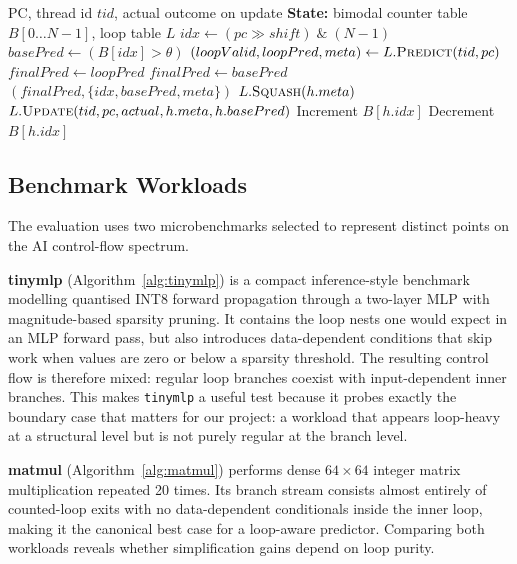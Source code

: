 \documentclass[conference]{IEEEtran}
\begin{document}
\begin{algorithm}[t]
\caption{LABP lookup and update flow}
\label{alg:lapbp}
\footnotesize
\begin{algorithmic}[1]
\Require PC, thread id $tid$, actual outcome on update
\State \textbf{State:} bimodal counter table $B[0 \ldots N-1]$, loop table $L$
    \State $idx \gets (pc \gg shift) \;\&\; (N-1)$
    \State $basePred \gets (B[idx] > \theta)$
    \State $(loopValid, loopPred, meta) \gets L.\textsc{Predict}(tid, pc)$
        \State $finalPred \gets loopPred$
    \Else
        \State $finalPred \gets basePred$
    \EndIf
    \State \Return $(finalPred,\{idx, basePred, meta\})$
\EndFunction
{}
        \State \Return
    \EndIf
        \State $L.\textsc{Squash}(h.meta)$
        \State \Return
    \EndIf
    \State $L.\textsc{Update}(tid, pc, actual, h.meta, h.basePred)$
        \State Increment $B[h.idx]$
    \Else
        \State Decrement $B[h.idx]$
    \EndIf
\EndFunction
\end{algorithmic}
\end{algorithm}

\subsection{Benchmark Workloads}
The evaluation uses two microbenchmarks selected to represent distinct points on the AI control-flow spectrum.

\textbf{tinymlp} (Algorithm~\ref{alg:tinymlp}) is a compact inference-style benchmark modelling quantised INT8 forward propagation through a two-layer MLP with magnitude-based sparsity pruning. It contains the loop nests one would expect in an MLP forward pass, but also introduces data-dependent conditions that skip work when values are zero or below a sparsity threshold. The resulting control flow is therefore mixed: regular loop branches coexist with input-dependent inner branches. This makes \texttt{tinymlp} a useful test because it probes exactly the boundary case that matters for our project: a workload that appears loop-heavy at a structural level but is not purely regular at the branch level.

\textbf{matmul} (Algorithm~\ref{alg:matmul}) performs dense $64\times64$ integer matrix multiplication repeated 20 times. Its branch stream consists almost entirely of counted-loop exits with no data-dependent conditionals inside the inner loop, making it the canonical best case for a loop-aware predictor. Comparing both workloads reveals whether simplification gains depend on loop purity.
\end{document}
